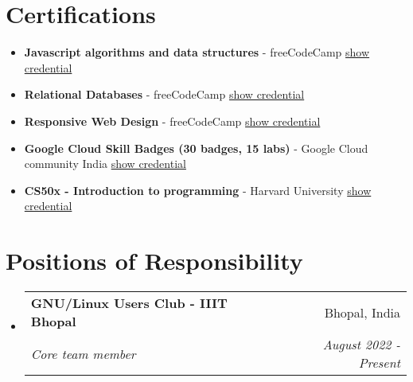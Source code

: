 \documentclass[a4paper,20pt]{article}
\makeatletter
\newcommand{\resumeSubheading}[4]{
  \vspace{-1pt}\item
    \begin{tabular*}{0.97\textwidth}{l@{\extracolsep{\fill}}r}
      \textbf{#1} & #2 \\
      \textit{#3} & \textit{#4} \\
    \end{tabular*}\vspace{-5pt}
}
\newcommand{\resumeCertification}[3]{
  \item \small{
    \textbf{#1}{ - #2 \hfill #3 \vspace{-5pt}}
  }
}
\newcommand{\resumeSubHeadingListStart}{\begin{itemize}[leftmargin=*]}
\newcommand{\resumeSubHeadingListEnd}{\end{itemize}}
\makeatother
\begin{document}
\section{Certifications}
\resumeSubHeadingListStart
    \resumeCertification
    {Javascript algorithms and data structures}
    {freeCodeCamp}{\href{https://www.freecodecamp.org/certification/satyamrs00/javascript-algorithms-and-data-structures}{show credential}}

    \resumeCertification
    {Relational Databases}
    {freeCodeCamp}{\href{https://www.freecodecamp.org/certification/satyamrs00/relational-database-v8}{show credential}}

    \resumeCertification
    {Responsive Web Design}
    {freeCodeCamp}{\href{https://www.freecodecamp.org/certification/satyamrs00/responsive-web-design}{show credential}}
    
    \resumeCertification
    {Google Cloud Skill Badges (30 badges, 15 labs)}
    {Google Cloud community India} {\href{https://www.cloudskillsboost.google/public_profiles/979efb3e-91bc-476f-ba38-d35c4879a1fa}{show credential}}

    \resumeCertification
    {CS50x - Introduction to programming}
    {Harvard University}{\href{https://certificates.cs50.io/5a9d3a4b-57f0-4d46-95fa-222159e1368f.pdf?size=letter}{show credential}}
    
\resumeSubHeadingListEnd

\vspace{-5pt}
\section{Positions of Responsibility}
\resumeSubHeadingListStart
    \resumeSubheading
    {GNU/Linux Users Club - IIIT Bhopal}{Bhopal, India}
    {Core team member}{August 2022 - Present}
\resumeSubHeadingListEnd
\end{document}
